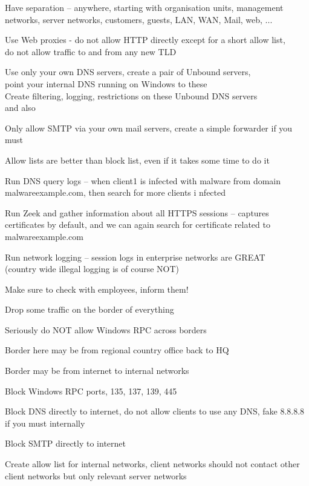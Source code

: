\documentclass[Screen16to9,17pt]{foils}
\begin{document}
\begin{list2}
\item Have separation -- anywhere, starting with organisation units, management networks, server networks, customers, guests, LAN, WAN, Mail, web, ...
\item Use Web proxies - do not allow HTTP directly except for a short allow list, \\
do not allow traffic to and from any new TLD
\item Use only your own DNS servers, create a pair of Unbound servers, \\
point your internal DNS running on Windows to these\\
Create filtering, logging, restrictions on these Unbound DNS servers\\
 and also 
\item Only allow SMTP via your own mail servers, create a simple forwarder if you must
\end{list2}

Allow lists are better than block list, even if it takes some time to do it



\begin{list2}
\item Run DNS query logs -- when client1 is infected with malware from domain malwareexample.com, then search for more clients i
nfected
\item Run Zeek and gather information about all HTTPS sessions -- captures certificates by default, and we can again search for
certificate related to malwareexample.com
\item Run network logging -- session logs in enterprise networks are GREAT \\
(country wide illegal logging is of course NOT)
\end{list2}

Make sure to check with employees, inform them!


\begin{list2}
\item Drop some traffic on the border of everything
\item Seriously do NOT allow Windows RPC across borders
\item Border here may be from regional country office back to HQ
\item Border may be from internet to internal networks
\item Block Windows RPC ports, 135, 137, 139, 445
\item Block DNS directly to internet, do not allow clients to use any DNS, fake 8.8.8.8 if you must internally
\item Block SMTP directly to internet
\item Create allow list for internal networks, client networks should not contact other client networks but only relevant server networks
\end{list2}
\end{document}
